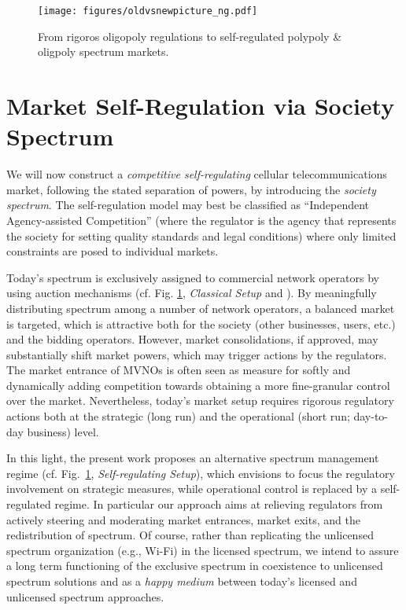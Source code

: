 \documentclass[conference]{IEEEtran}
\begin{document}
\begin{figure}[htbp]
\centering
\texttt{[image: figures/oldvsnewpicture\_ng.pdf]}
\caption{From rigoros oligopoly regulations to self-regulated polypoly \& oligpoly spectrum markets.}
\label{fig:oldvsnewpicture}
\end{figure}

	

\section{Market Self-Regulation via Society Spectrum} \label{sec:market_design}



We will now construct a \textit{competitive self-regulating} \cite{ogus1995rethinking} cellular telecommunications market, following the stated separation of powers, by introducing the \textit{society spectrum}. The self-regulation model may best be classified as  ``Independent Agency-assisted Competition'' (where the regulator is the agency that represents the society for setting quality standards and legal conditions) where only limited constraints are posed to individual markets. 



Today's spectrum is exclusively assigned to commercial network operators by using auction mechanisms (cf. Fig. \ref{fig:oldvsnewpicture}, \textit{ Classical Setup} and \cite{melody1980radio}). By meaningfully distributing spectrum among a number of network operators, a balanced market is targeted, which is attractive both for the society (other businesses, users, etc.) and the bidding operators. However, market consolidations, if approved, may substantially shift market powers, which may trigger actions by the regulators. The market entrance of MVNOs is often seen as measure for softly and dynamically adding competition towards obtaining a more fine-granular control over the market. Nevertheless, today's market setup requires rigorous regulatory actions both at the strategic (long run) and the operational (short run; day-to-day business) level.

In this light, the present work proposes an alternative spectrum management regime (cf. Fig.~\ref{fig:oldvsnewpicture}, \textit{Self-regulating Setup}), which envisions to focus the regulatory involvement on strategic measures, while operational control is replaced by a self-regulated regime. In particular our approach aims at relieving regulators from actively steering and moderating market entrances, market exits, and the redistribution of spectrum. Of course, rather than replicating the unlicensed spectrum organization (e.g., Wi-Fi) in the licensed spectrum, we intend to assure a long term functioning of the exclusive spectrum in coexistence to unlicensed spectrum solutions and as a \textit{happy medium} between today's licensed and unlicensed spectrum approaches.
\end{document}

